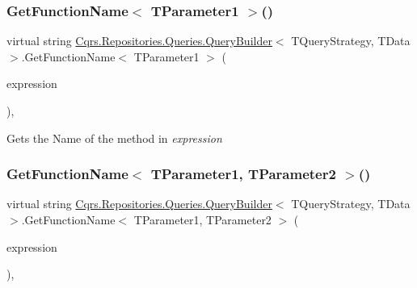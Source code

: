 \subsubsection{\texorpdfstring{Get\+Function\+Name$<$ T\+Parameter1 $>$()}{GetFunctionName< TParameter1 >()}}
{\footnotesize\ttfamily virtual string \hyperlink{classCqrs_1_1Repositories_1_1Queries_1_1QueryBuilder}{Cqrs.\+Repositories.\+Queries.\+Query\+Builder}$<$ T\+Query\+Strategy, T\+Data $>$.Get\+Function\+Name$<$ T\+Parameter1 $>$ (\begin{DoxyParamCaption}\item[{Func$<$ T\+Parameter1, T\+Query\+Strategy $>$}]{expression }\end{DoxyParamCaption})\hspace{0.3cm}{\ttfamily [protected]}, {\ttfamily [virtual]}}



Gets the Name of the method in {\itshape expression}  

\mbox{\label{classCqrs_1_1Repositories_1_1Queries_1_1QueryBuilder_a45c4e9123301de6f5b3cdd41c79e86ab_a45c4e9123301de6f5b3cdd41c79e86ab}} 
\subsubsection{\texorpdfstring{Get\+Function\+Name$<$ T\+Parameter1, T\+Parameter2 $>$()}{GetFunctionName< TParameter1, TParameter2 >()}}
{\footnotesize\ttfamily virtual string \hyperlink{classCqrs_1_1Repositories_1_1Queries_1_1QueryBuilder}{Cqrs.\+Repositories.\+Queries.\+Query\+Builder}$<$ T\+Query\+Strategy, T\+Data $>$.Get\+Function\+Name$<$ T\+Parameter1, T\+Parameter2 $>$ (\begin{DoxyParamCaption}\item[{Func$<$ T\+Parameter1, T\+Parameter2, T\+Query\+Strategy $>$}]{expression }\end{DoxyParamCaption})\hspace{0.3cm}{\ttfamily [protected]}, {\ttfamily [virtual]}}



